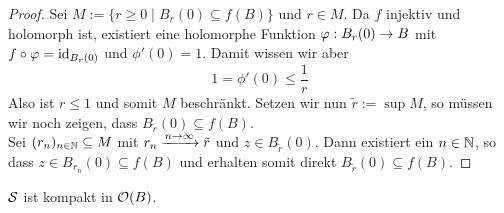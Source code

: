 \begin{proof}
  Sei $M:= \{ r\geq 0\mid B_r(0) \subseteq f(B) \}$ und $r \in M$. Da $f$ injektiv und
  holomorph ist, existiert eine holomorphe Funktion $\phi: B_r(0) \ra
  B$ mit $f \circ \phi = \id_{B_r(0)}$ und $\phi'(0) = 1$. Damit wissen
  wir aber
  \[
  1 = \phi'(0) \leq \frac{1}{r}
  \]
  Also ist $r \leq 1$ und somit $M$ beschränkt. Setzen wir nun $\tilde
  r := \sup M$, so müssen wir noch zeigen, dass $B_{\tilde r}(0) \subseteq
  f(B)$.\\
  Sei $(r_n)_{n \in \N}\subseteq M$ mit $r_n \xrightarrow{n \ra
    \infty} \tilde r$ und $z \in B_{\tilde r}(0)$. Dann existiert ein $n \in \N$,
  so dass $z \in B_{r_n}(0)\subseteq f(B)$ und erhalten somit direkt
  $B_{\tilde r}(0) \subseteq f(B)$.
\end{proof}

\begin{thm}
  \label{thm:schlicht-kompakt}
  $\S$ ist kompakt in $\hol(B)$.
\end{thm}


